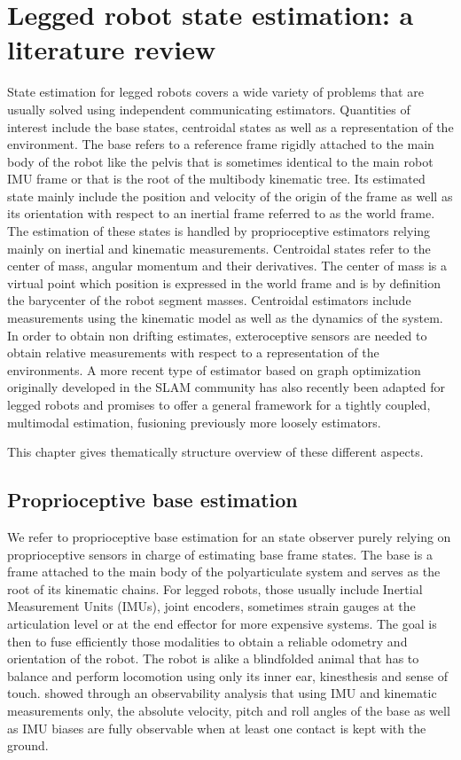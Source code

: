 \chapter{Legged robot state estimation: a literature review}
State estimation for legged robots covers a wide variety of problems that are usually solved using independent communicating estimators.
Quantities of interest include the base states, centroidal states as well as a representation of the environment. The base refers to a reference
frame rigidly attached to the main body of the robot like the pelvis that is sometimes identical to the main robot IMU frame or that is the 
root of the multibody kinematic tree. Its estimated state mainly include the position and velocity of the origin of the frame as well as its orientation
with respect to an inertial frame referred to as the world frame. The estimation of these states is handled by proprioceptive estimators relying 
mainly on inertial and kinematic measurements. Centroidal states refer to the center of mass, angular momentum and their derivatives. The center 
of mass is a virtual point which position is expressed in the world frame and is by definition the barycenter of the robot segment masses. Centroidal
estimators include measurements using the kinematic model as well as the dynamics of the system. In order to obtain non drifting estimates,
exteroceptive sensors are needed to obtain relative measurements with respect to a representation of the environments. A more recent type of estimator
based on graph optimization originally developed in the SLAM community has also recently been adapted for legged robots and promises to offer a general
framework for a tightly coupled, multimodal estimation, fusioning previously more loosely estimators. 

This chapter gives thematically structure overview of these different aspects. 



\section{Proprioceptive base estimation}
We refer to proprioceptive base estimation for an state observer purely relying on proprioceptive sensors in charge of 
estimating base frame states. The base is a frame attached to the main body of the polyarticulate system and serves
as the root of its kinematic chains. For legged robots, those usually include Inertial Measurement Units (IMUs), joint encoders, sometimes strain gauges at the 
articulation level or at the end effector for more expensive systems. The goal is then to fuse efficiently those 
modalities to obtain a reliable odometry and orientation of the robot. The robot is alike a blindfolded animal that has to balance and perform locomotion using 
only its inner ear, kinesthesis and sense of touch. \cite{bloesch2013state,rotella2014state} showed through an observability analysis that using IMU and kinematic measurements 
only, the absolute velocity, pitch and roll angles of the base as well as IMU biases are fully observable when at least one contact 
is kept with the ground.

